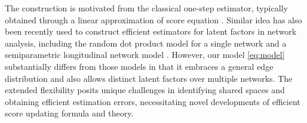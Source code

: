 \documentclass[12pt]{article}
\newcommand{\blue}[1]{\textcolor{blue}{#1}}
\begin{document}
The construction is motivated from the classical one-step estimator, typically obtained  through a linear approximation of score equation \citep{van2000asymptotic}. 
Similar idea has also been recently used to construct efficient estimators for latent factors in network analysis, including the random dot product model for a single network \citep{xie2023efficient}  and a semiparametric longitudinal network model \citep{he2023semiparametric}. 
However, our model \eqref{eq:model} substantially differs from those models in that it embraces a general edge distribution and also allows distinct latent factors over multiple networks. 
The extended flexibility posits unique challenges in identifying shared spaces and obtaining efficient  estimation errors, necessitating   novel developments of efficient score updating formula and theory. 







\end{document}
